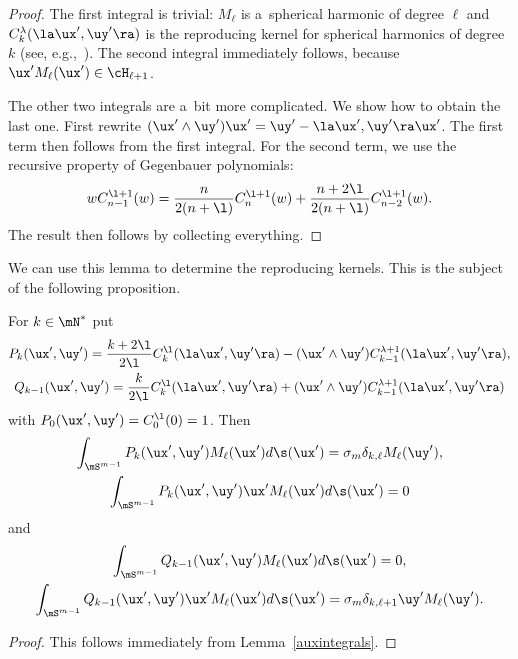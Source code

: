 \begin{proof}
The f\/irst integral is trivial: $M_{\ell}$ is a~spherical harmonic of degree $\ell$ and
$C_{k}^{\lambda}(\la\ux',\uy'\ra)$ is the reproducing kernel for spherical harmonics of degree
$k$ (see, e.g.,~\cite{MR1827871}).
The second integral immediately follows, because $\ux'M_{\ell}(\ux')\in\cH_{\ell+1}$.

The other two integrals are a~bit more complicated.
We show how to obtain the last one.
First rewrite
$(\ux'\wedge\uy')\ux'=\uy'-\la\ux',\uy'\ra\ux'$.
The f\/irst term then follows from the f\/irst integral.
For the second term, we use the recursive property of Gegenbauer polynomials:
\begin{gather*}%
w C^{\l+1}_{n-1}(w)=\frac{n}{2(n+\l)}C^{\l+1}_{n}(w)+\frac{n+2\l}{2(n+\l)}
C^{\l+1}_{n-2}(w).
\end{gather*}
The result then follows by collecting everything.
\end{proof}

We can use this lemma to determine the reproducing kernels.
This is the subject of the following proposition.

\begin{proposition}
\label{reprkernels}
For $k\in\mN^{*}$ put
\begin{gather*}
P_{k}(\ux', \uy') = \frac{k+2\l}{2\l} C_{k}^{\l}(\la\ux', \uy' \ra) -(\ux' \wedge \uy' )
C_{k-1}^{\lambda+1}(\la\ux', \uy' \ra),\\
Q_{k-1}(\ux', \uy') = \frac{k}{2\l} C_{k}^{\l}(\la\ux', \uy' \ra) +(\ux' \wedge \uy' )
C_{k-1}^{\lambda+1}(\la\ux', \uy' \ra)
\end{gather*}
with $P_{0}(\ux',\uy')=C_{0}^{\l}(0)=1$.
Then
\begin{gather*}
\int_{\mS^{m-1}} P_{k}(\ux', \uy') M_{\ell}(\ux')d \s (\ux') = \sigma_m \delta_{k, \ell}
M_{\ell}(\uy'),\\
\int_{\mS^{m-1}} P_{k}(\ux', \uy') \ux'M_{\ell}(\ux')d \s (\ux') = 0
\end{gather*}
and
\begin{gather*}
\int_{\mS^{m-1}} Q_{k-1}(\ux', \uy') M_{\ell}(\ux')d \s (\ux') = 0,\\
\int_{\mS^{m-1}} Q_{k-1}(\ux', \uy') \ux'M_{\ell}(\ux')d \s (\ux') = \sigma_m \delta_{k, \ell+1}
\uy'M_{\ell}(\uy').
\end{gather*}
\end{proposition}

\begin{proof}
This follows immediately from Lemma~\ref{auxintegrals}.
\end{proof}

